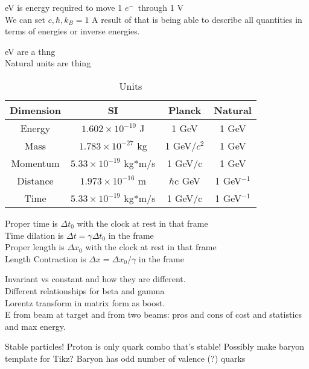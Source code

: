 \documentclass{article}
\date{Winter Semester 2022}
\author{\EC}
\def\elec{$e^{-}$\ }
\begin{document}
\maketitle

\begin{lecture}
    eV is energy required to move 1 \elec through 1 V \\
    We can set $c,\hbar,k_B=1$ A result of that is being able to describe all quantities in terms of energies or inverse energies. 
\end{lecture}
\begin{lecture}
    eV are a thng\\
    Natural units are thing
    \begin{table}[H]
        \centering
        \begin{tabular}{|c|c|c|c|}
            \hline
            Dimension & SI & Planck & Natural 
            \\\hline
            Energy & $1.602\times10^{-10}$ J & 1 GeV & 1 GeV \\\hline
            Mass & $1.783\times10^{-27}$ kg & 1 GeV/$c^2$ & 1 GeV\\\hline
            Momentum & $5.33\times10^{-19}$ kg*m/s & 1 GeV/c & 1 GeV\\\hline
            Distance & $1.973\times10^{-16}$ m & $\hbar$c GeV & 1 GeV$^{-1}$\\\hline
            Time & $5.33\times10^{-19}$ kg*m/s & 1 GeV/c & 1 GeV$^{-1}$
            \\\hline
        \end{tabular}
        \caption{Units}
        \label{tab:units}
    \end{table}
    \noindent Proper time is $\Delta t_0$ with the clock at rest in that frame
    \\
    Time dilation is $\Delta t =\gamma\Delta t_0$ in the frame
    \\
    Proper length is $\Delta x_0$ with the clock at rest in that frame
    \\
    Length Contraction is $\Delta x =\Delta x_0/\gamma$ in the frame
\end{lecture}
\begin{lecture}
    Invariant vs constant and how they are different. 
    \\
    Different relationships for beta and gamma
    \\
    Lorentz transform in matrix form as boost.
    \\
    E from beam at target and from two beams: pros and cons of cost and statistics and max energy. 
\end{lecture}
\begin{lecture}
    Stable particles! Proton is only quark combo that's stable! 
    Possibly make baryon template for Tikz? Baryon has odd number of valence (?) quarks
\end{lecture}
\end{document}
